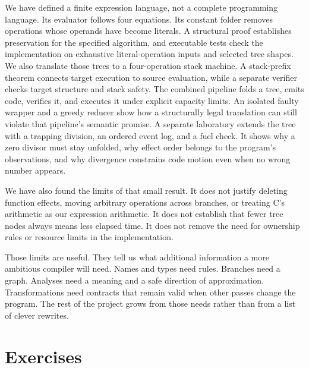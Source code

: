 We have defined a finite expression language, not a complete programming language.
Its evaluator follows four equations.
Its constant folder removes operations whose operands have become literals.
A structural proof establishes preservation for the specified algorithm, and executable tests check the implementation on exhaustive literal-operation inputs and selected tree shapes.
We also translate those trees to a four-operation stack machine.
A stack-prefix theorem connects target execution to source evaluation, while a separate verifier checks target structure and stack safety.
The combined pipeline folds a tree, emits code, verifies it, and executes it under explicit capacity limits.
An isolated faulty wrapper and a greedy reducer show how a structurally legal translation can still violate that pipeline's semantic promise.
A separate laboratory extends the tree with a trapping division, an ordered event log, and a fuel check.
It shows why a zero divisor must stay unfolded, why effect order belongs to the program's observations, and why divergence constrains code motion even when no wrong number appears.

We have also found the limits of that small result.
It does not justify deleting function effects, moving arbitrary operations across branches, or treating C's arithmetic as our expression arithmetic.
It does not establish that fewer tree nodes always means less elapsed time.
It does not remove the need for ownership rules or resource limits in the implementation.

Those limits are useful.
They tell us what additional information a more ambitious compiler will need.
Names and types need rules.
Branches need a graph.
Analyses need a meaning and a safe direction of approximation.
Transformations need contracts that remain valid when other passes change the program.
The rest of the project grows from those needs rather than from a list of clever rewrites.

\section{Exercises}
\label{sec:programs-meaning-exercises}

